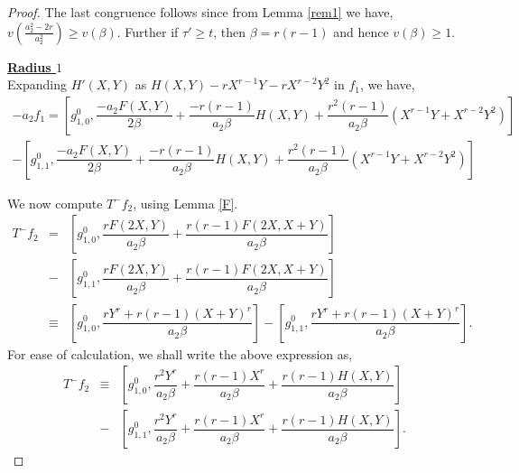 \documentclass[11pt, reqno]{amsart}
\numberwithin{equation}{section}
\newcommand\Q{\mathbb{Q}}
\theoremstyle{definition}
\theoremstyle{remark}
\theoremstyle{definition}
\theoremstyle{remark}
\theoremstyle{remark}
\begin{document}
\begin{proof}
The last congruence follows since from Lemma \ref{rem1} we have,
    $v\left(\frac{a_{2}^2-2r}{a_{2}^2}\right)\geq v(\beta)$. Further if $\tau'\geq t$, then $\beta=r(r-1)$ and hence $v(\beta)\geq 1.$
    
\noindent\textbf{\underline{Radius $1$}}\\
Expanding $H'(X,Y)$ as $H(X,Y)-rX^{r-1}Y-rX^{r-2}Y^2$ in $f_{1}$, we have,
\begin{eqnarray}\label{a2f1odd}
    -a_2f_1 = \left[g_{1,0}^0, \dfrac{-a_2F(X,Y)}{2\beta} + \dfrac{-r(r-1)}{a_{2}\beta}H(X,Y)+ \dfrac{r^2(r-1)}{a_2\beta}(X^{r-1}Y+X^{r-2}Y^2)\right] \nonumber\\
    - \left[g_{1,1}^0,\dfrac{-a_2F(X,Y)}{2\beta} + \dfrac{-r(r-1)}{a_{2}\beta}H(X,Y)+\dfrac{r^2(r-1)}{a_2\beta}(X^{r-1}Y+X^{r-2}Y^2) \right]
\end{eqnarray} 

We now compute $T^-f_2$, using Lemma \ref{F}. %
\begin{eqnarray*}
    T^-f_2 &=& \left[g_{1,0}^0, \dfrac{rF(2X,Y)}{a_2\beta} + \dfrac{r(r-1)F(2X,X+Y)}{a_2\beta}\right]\\
    &-& \left[g_{1,1}^{0}, \dfrac{rF(2X,Y)}{a_2\beta} + \dfrac{r(r-1)F(2X,X+Y)}{a_2\beta}\right]\\
    &\equiv& \left[g_{1,0}^{0}, \dfrac{rY^r+r(r-1)(X+Y)^r}{a_2\beta} \right] - \left[g_{1,1}^{0}, \dfrac{rY^r+r(r-1)(X+Y)^r}{a_2\beta}  \right].
    \end{eqnarray*}
    For ease of calculation, we shall write the above expression as,
    \begin{eqnarray}\label{T-f2odd}
     T^-f_2 &\equiv& \left[g_{1,0}^{0}, \dfrac{r^{2}Y^{r}}{a_{2}\beta}+ \dfrac{r(r-1)X^r}{a_2\beta}+ \dfrac{r(r-1)H(X,Y)}{a_{2}\beta}\right]\nonumber\\
     &-& \left[g_{1,1}^{0},  \dfrac{r^{2}Y^{r}}{a_{2}\beta}+ \dfrac{r(r-1)X^r}{a_2\beta}+ \dfrac{r(r-1)H(X,Y)}{a_{2}\beta}\right]. \label{T-f2}
     \end{eqnarray}
    
    
   

\end{proof}
\end{document}
